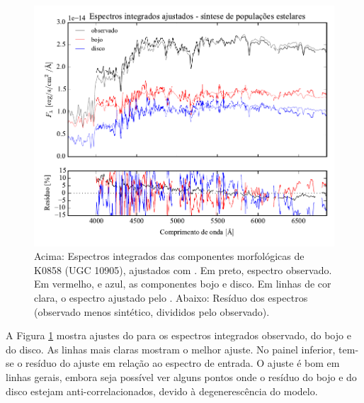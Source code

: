\begin{figure}
	\includegraphics[page=15,width=\textwidth]{figuras/sample006a_synthesis}
	\caption[Espectros ajustados com \starlight das componentes morfológicas de
	K0858 (UGC 10905)]
	{Acima: Espectros integrados das componentes morfológicas de
	K0858 (UGC 10905), ajustados com \starlight. Em preto, espectro observado. Em
	vermelho, e azul, as componentes bojo e disco. Em linhas de cor clara, o
	espectro ajustado pelo \starlight. Abaixo: Resíduo dos espectros (observado
	menos sintético, divididos pelo observado).}
	\label{fig:decompSinteseSpec}
\end{figure}

A Figura \ref{fig:decompSinteseSpec} mostra ajustes do \starlight para os
espectros integrados observado, do bojo e do disco. As linhas mais claras
mostram o melhor ajuste. No painel inferior, tem-se o resíduo do ajuste em
relação ao espectro de entrada. O ajuste é bom em linhas gerais, embora seja
possível ver alguns pontos onde o resíduo do bojo e do disco estejam
anti-correlacionados, devido à degenerescência do modelo.


